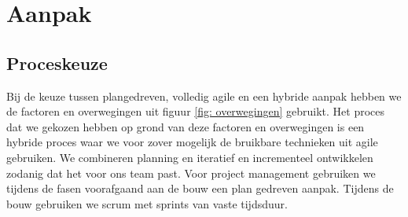 \section{Aanpak}
\subsection{Proceskeuze}

Bij de keuze tussen plangedreven, volledig agile en een hybride aanpak hebben we de
factoren en overwegingen uit figuur \ref{fig: overwegingen} gebruikt.
Het proces dat we gekozen hebben op grond van deze factoren en overwegingen is een hybride
proces waar we voor zover mogelijk de bruikbare technieken uit agile gebruiken. We combineren
planning en iteratief en incrementeel ontwikkelen zodanig dat het voor ons team past.
Voor project management gebruiken we tijdens de fasen voorafgaand aan
de bouw een plan gedreven aanpak. Tijdens de bouw gebruiken we scrum
met sprints van vaste tijdsduur.

